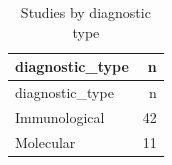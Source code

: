 \documentclass[
  letterpaper,
  DIV=11,
  numbers=noendperiod]{scrartcl}
\newenvironment{Shaded}{\begin{snugshade}}{\end{snugshade}}
\newcommand{\CommentTok}[1]{\textcolor[rgb]{0.37,0.37,0.37}{#1}}
\newcommand{\FunctionTok}[1]{\textcolor[rgb]{0.28,0.35,0.67}{#1}}
\newcommand{\NormalTok}[1]{\textcolor[rgb]{0.00,0.23,0.31}{#1}}
\newcommand{\OtherTok}[1]{\textcolor[rgb]{0.00,0.23,0.31}{#1}}
\newcommand{\SpecialCharTok}[1]{\textcolor[rgb]{0.37,0.37,0.37}{#1}}
\begin{document}
\begin{longtable}[]{@{}lr@{}}
\caption{Studies by diagnostic type}\tabularnewline
\toprule\noalign{}
diagnostic\_type & n \\
\midrule\noalign{}
\endfirsthead
\toprule\noalign{}
diagnostic\_type & n \\
\midrule\noalign{}
\endhead
\bottomrule\noalign{}
\endlastfoot
Immunological & 42 \\
Molecular & 11 \\
\end{longtable}

\begin{Shaded}
\end{Shaded}
\end{document}
